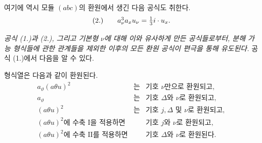 
여기에 역시 모듈 $(abc)$의 환원에서 생긴 다음 공식도 취한다.
\[
\begin{array}{r@{\qquad}l}
(2.) & a_\nu^3a_xu_\nu=\frac13i\cdot u_x.
\end{array}
\]

\emph{공식 (1.)과 (2.), 그리고 기본형 $\nu$에 대해 이와 유사하게 만든 공식들로부터, 분해 가능 형식들에 관한 관계들을 제외한 이후의 모든 환원 공식이 편극을 통해 유도된다.} 공식 (1.)에서 다음을 알 수 있다.

형식열은 다음과 같이 환원된다.
\[
\begin{array}{rcl}
a_\vartheta(a\theta u)^2 &\text{는}& \text{기호 }\nu\text{만으로 환원되고},\\[0.2em]
a_\vartheta &\text{는}& \text{기호 }\Delta\text{와 }\nu\text{로 환원되고},\\[0.2em]
(a\theta u)^2 &\text{는}& \text{기호 }j,\Delta\text{ 및 }\nu\text{로 환원되고},\\[0.2em]
(a\theta u)^2\text{에 수축 I을 적용하면} &\text{}& \text{기호 }j\text{와 }\nu\text{로 환원되고},\\[0.2em]
(a\theta u)^2\text{에 수축 II를 적용하면} &\text{}& \text{기호 }\Delta\text{와 }\nu\text{로 환원된다}.
\end{array}
\]
